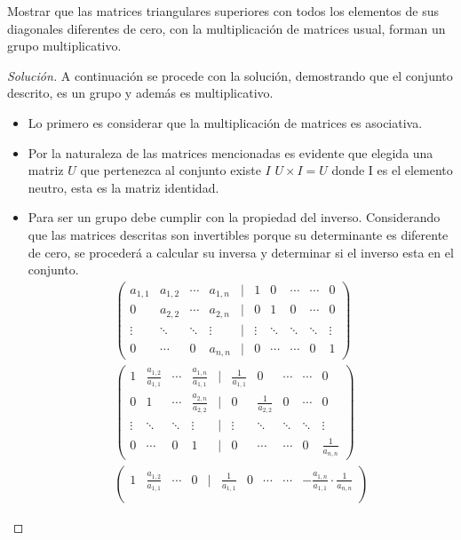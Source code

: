 \documentclass[12pt]{book}
\newenvironment{solucion}
  {\renewcommand\qedsymbol{$\square$}\begin{proof}[Solución]}
  {\end{proof}}
\begin{document}
\eje Mostrar que las matrices triangulares superiores con todos los elementos de sus diagonales diferentes de cero, con la multiplicación de matrices usual, forman un grupo multiplicativo.
\begin{solucion}
A continuación se procede con la solución, demostrando que el conjunto descrito, es un grupo y además es multiplicativo.
\begin{itemize}
    \item Lo primero es considerar que la multiplicación de matrices es asociativa.
    \item Por la naturaleza de las matrices mencionadas es evidente que elegida una matriz $U$ que pertenezca al conjunto existe $I$ $U\times I=U$ donde I es el elemento neutro, esta es la matriz identidad.
    \newpage
    \item Para ser un grupo debe cumplir con la propiedad del inverso. Considerando que las matrices descritas son invertibles porque su determinante es diferente de cero, se procederá a calcular su inversa y determinar si el inverso esta en el conjunto.
        \begin{align*}
            \begin{pmatrix}
                a_{1,1}&a_{1,2}&\cdots&a_{1,n}&|&1&0&\cdots&\cdots&0\\
                0&a_{2,2}&\cdots&a_{2,n}&|&0&1&0&\cdots&0\\
                \vdots&\ddots&\ddots&\vdots&|&\vdots&\ddots&\ddots&\ddots&\vdots\\
                0&\cdots&0&a_{n,n}&|&0&\cdots&\cdots&0&1
            \end{pmatrix}\\
            \begin{pmatrix}
                1&\frac{a_{1,2}}{a_{1,1}}&\cdots&\frac{a_{1,n}}{a_{1,1}}&|&\frac{1}{a_{1,1}}&0&\cdots&\cdots&0\\
                0&1&\cdots&\frac{a_{2,n}}{a_{2,2}}&|&0&\frac{1}{a_{2,2}}&0&\cdots&0\\
                \vdots&\ddots&\ddots&\vdots&|&\vdots&\ddots&\ddots&\ddots&\vdots\\
                0&\cdots&0&1&|&0&\cdots&\cdots&0&\frac{1}{a_{n,n}}
            \end{pmatrix}\\
            \begin{pmatrix}
                1&\frac{a_{1,2}}{a_{1,1}}&\cdots&0&|&\frac{1}{a_{1,1}}&0&\cdots&\cdots&-\frac{a_{1,n}}{a_{1,1}}\cdot\frac{1}{a_{n,n}}\\

\end{pmatrix}
\end{align*}
\end{itemize}
\end{solucion}
\end{document}
